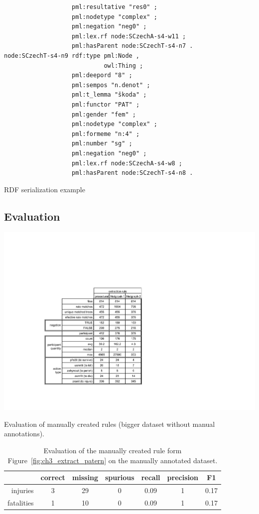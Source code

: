 \begin{listing}[ht]
\begin{verbatim}
                   pml:resultative "res0" ;
                   pml:nodetype "complex" ;
                   pml:negation "neg0" ;
                   pml:lex.rf node:SCzechA-s4-w11 ;
                   pml:hasParent node:SCzechT-s4-n7 .
node:SCzechT-s4-n9 rdf:type pml:Node ,
                            owl:Thing ;
                   pml:deepord "8" ;
                   pml:sempos "n.denot" ;
                   pml:t_lemma "škoda" ;
                   pml:functor "PAT" ;
                   pml:gender "fem" ;
                   pml:nodetype "complex" ;
                   pml:formeme "n:4" ;
                   pml:number "sg" ;
                   pml:negation "neg0" ;
                   pml:lex.rf node:SCzechA-s4-w8 ;
                   pml:hasParent node:SCzechT-s4-n8 .
\end{verbatim}
\caption{RDF serialization example}
\label{lst:rdf_serialization}
\end{listing}



\clearpage

\subsection{Evaluation}



\begin{table}
	\centering
		\includegraphics[angle=-90,width=0.6\hsize]{../img/ch3_tab_manual_rules}
	\caption{Evaluation of manually created rules (bigger dataset without manual annotations).}
	\label{tab:ch3_tab_manual_rules}
\end{table}



\begin{table}
	\centering
	\begin{tabular}{|r|c|c|c|c|c|c|}
		\hline
		 & correct & missing & spurious & recall & precision & F1\\
		\hline
		injuries & 3 & 29 & 0 & 0.09 & 1 & 0.17\\
		\hline
		fatalities & 1 & 10 & 0 & 0.09 & 1 & 0.17\\
		\hline
	\end{tabular}
	\caption{Evaluation of the manually created rule form Figure~\ref{fig:ch3_extract_patern} on the manually annotated dataset.}
	\label{tab:ch3_extract_patern_eval}
\end{table}



